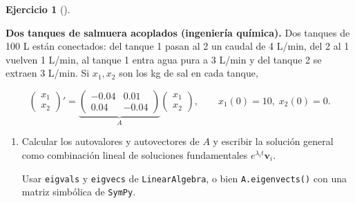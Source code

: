 \documentclass[
  spanish,
  a4paper,
]{scrreport}
\theoremstyle{definition}
\newtheorem{exercise}{Ejercicio}[chapter]
\theoremstyle{remark}
\begin{document}
\begin{exercise}[]\protect\hypertarget{exr-tanques-acoplados}{}\label{exr-tanques-acoplados}

\textbf{Dos tanques de salmuera acoplados (ingeniería química).} Dos
tanques de 100 L están conectados: del tanque 1 pasan al 2 un caudal de
4 L/min, del 2 al 1 vuelven 1 L/min, al tanque 1 entra agua pura a 3
L/min y del tanque 2 se extraen 3 L/min. Si \(x_1, x_2\) son los kg de
sal en cada tanque,

\[
\begin{pmatrix} x_1 \\ x_2 \end{pmatrix}' =
\underbrace{\begin{pmatrix} -0.04 & 0.01 \\ 0.04 & -0.04 \end{pmatrix}}_{A}
\begin{pmatrix} x_1 \\ x_2 \end{pmatrix},
\qquad x_1(0) = 10,\; x_2(0) = 0.
\]

\begin{enumerate}
\def\labelenumi{\alph{enumi}.}
\item
  Calcular los autovalores y autovectores de \(A\) y escribir la
  solución general como combinación lineal de soluciones fundamentales
  \(e^{\lambda_i t}\mathbf{v}_i\).

  \begin{tcolorbox}[enhanced jigsaw, arc=.35mm, bottomrule=.15mm, bottomtitle=1mm, breakable, colback=white, colbacktitle=quarto-callout-note-color!10!white, colframe=quarto-callout-note-color-frame, coltitle=black, left=2mm, leftrule=.75mm, opacityback=0, opacitybacktitle=0.6, rightrule=.15mm, title=\textcolor{quarto-callout-note-color}{\faInfo}\hspace{0.5em}{Ayuda}, titlerule=0mm, toprule=.15mm, toptitle=1mm]

  Usar \texttt{eigvals} y \texttt{eigvecs} de \texttt{LinearAlgebra}, o
  bien \texttt{A.eigenvects()} con una matriz simbólica de
  \texttt{SymPy}.

  \end{tcolorbox}

  \begin{tcolorbox}[enhanced jigsaw, arc=.35mm, bottomrule=.15mm, bottomtitle=1mm, breakable, colback=white, colbacktitle=quarto-callout-tip-color!10!white, colframe=quarto-callout-tip-color-frame, coltitle=black, left=2mm, leftrule=.75mm, opacityback=0, opacitybacktitle=0.6, rightrule=.15mm, title=\textcolor{quarto-callout-tip-color}{\faLightbulb}\hspace{0.5em}{Solución}, titlerule=0mm, toprule=.15mm, toptitle=1mm]


\end{tcolorbox}
\end{enumerate}
\end{exercise}
\end{document}
